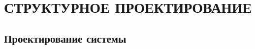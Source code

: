 \section{СТРУКТУРНОЕ ПРОЕКТИРОВАНИЕ}
\label{sec:structural}

\subsection{Проектирование системы}
\label{sub:domain:system_design}